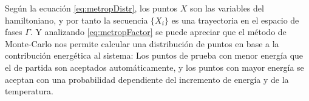 \documentclass[11pt, a4paper]{article} %
\theoremstyle{named}
\begin{document}
Según la ecuación \eqref{eq:metropDistr}, los puntos $X$ son las variables del hamiltoniano, y por tanto la secuencia $\{X_i\}$ es una trayectoria en el espacio de fases $\Gamma$. Y analizando \eqref{eq:metropFactor} se puede apreciar que el método de Monte-Carlo nos permite calcular una distribución de puntos en base a la contribución energética al sistema: Los puntos de prueba con menor energía que el de partida son aceptados automáticamente, y los puntos con mayor energía se aceptan con una probabilidad dependiente del incremento de energía y de la temperatura.




\nocite{tejeroProb}
\nocite{greinier}
\nocite{frenkel}
\nocite{salcido}
\nocite{haro}
\nocite{gottwald}
\nocite{pathria}
\nocite{huang}
\nocite{newmann}
\nocite{allen}
\nocite{krauth}
\nocite{koonin}
\nocite{wannier}
\nocite{reif}
\nocite{dyson}
\nocite{dorfman}
\nocite{groot}



\end{document}
